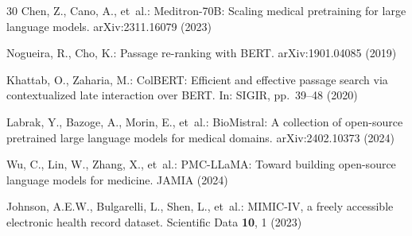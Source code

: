 \documentclass[runningheads]{llncs}
\begin{document}
\begin{thebibliography}{30}
Chen, Z., Cano, A., et~al.: Meditron-70B: Scaling medical pretraining for large language models. arXiv:2311.16079 (2023)

Nogueira, R., Cho, K.: Passage re-ranking with BERT. arXiv:1901.04085 (2019)

Khattab, O., Zaharia, M.: ColBERT: Efficient and effective passage search via contextualized late interaction over BERT. In: SIGIR, pp.~39--48 (2020)

Labrak, Y., Bazoge, A., Morin, E., et~al.: BioMistral: A collection of open-source pretrained large language models for medical domains. arXiv:2402.10373 (2024)

Wu, C., Lin, W., Zhang, X., et~al.: PMC-LLaMA: Toward building open-source language models for medicine. JAMIA (2024)

Johnson, A.E.W., Bulgarelli, L., Shen, L., et~al.: MIMIC-IV, a freely accessible electronic health record dataset. Scientific Data \textbf{10}, 1 (2023)

\end{thebibliography}
\end{document}
